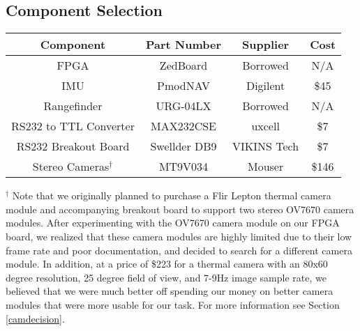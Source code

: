 \subsection{Component Selection} \label{componentSelection}

\begin{center}
\begin{tabular}{ |c|c|c|c| } 
 \hline
 \textbf{Component} & \textbf{Part Number}  & \textbf{Supplier} & \textbf{Cost}  \\ \hline
 FPGA & ZedBoard & Borrowed & N/A  \\ \hline
 IMU & PmodNAV & Digilent & \$45  \\ \hline
 Rangefinder & URG-04LX & Borrowed & N/A  \\ \hline
 RS232 to TTL Converter & MAX232CSE & uxcell & \$7  \\ \hline
 RS232 Breakout Board & Swellder DB9 & VIKINS Tech & \$7  \\ \hline
 Stereo Cameras$^\dagger$ & MT9V034 & Mouser & \$146  \\ 
 \hline
\end{tabular}
\end{center}
$^\dagger$ Note that we originally planned to purchase a Flir Lepton thermal camera module and accompanying breakout board to support two stereo OV7670 camera modules. After experimenting with the OV7670 camera module on our FPGA board, we realized that these camera modules are highly limited due to their low frame rate and poor documentation, and decided to search for a different camera module. In addition, at a price of \$223 for a thermal camera with an 80x60 degree resolution, 25 degree field of view, and 7-9Hz image sample rate, we believed that we were much better off spending our money on better camera modules that were more usable for our task. For more information see Section \ref{camdecision}.